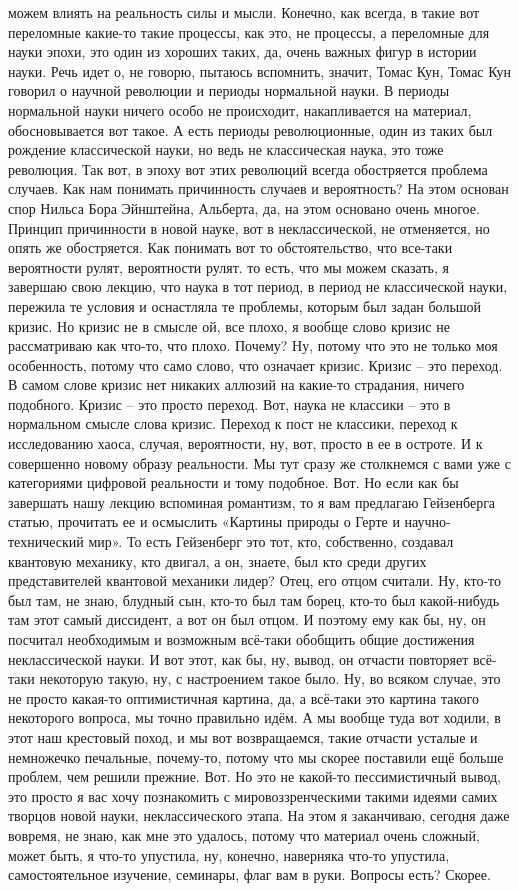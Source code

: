 можем влиять на реальность силы и мысли. Конечно, как всегда, в такие вот
переломные какие-то такие процессы, как это, не процессы, а переломные для науки
эпохи, это один из хороших таких, да, очень важных фигур в истории науки. Речь
идет о, не говорю, пытаюсь вспомнить, значит, Томас Кун, Томас Кун говорил о
научной революции и периоды нормальной науки. В периоды нормальной науки ничего
особо не происходит, накапливается на материал, обосновывается вот такое. А есть
периоды революционные, один из таких был рождение классической науки, но ведь не
классическая наука, это тоже революция. Так вот, в эпоху вот этих революций
всегда обостряется проблема случаев. Как нам понимать причинность случаев и
вероятность? На этом основан спор Нильса Бора Эйнштейна, Альберта, да, на этом
основано очень многое. Принцип причинности в новой науке, вот в неклассической,
не отменяется, но опять же обостряется. Как понимать вот то обстоятельство, что
все-таки вероятности рулят, вероятности рулят. то есть, что мы можем сказать, я
завершаю свою лекцию, что наука в тот период, в период не классической науки,
пережила те условия и оснастляла те проблемы, которым был задан большой кризис.
Но кризис не в смысле ой, все плохо, я вообще слово кризис не рассматриваю как
что-то, что плохо. Почему? Ну, потому что это не только моя особенность, потому
что само слово, что означает кризис. Кризис – это переход. В самом слове кризис
нет никаких аллюзий на какие-то страдания, ничего подобного. Кризис – это просто
переход. Вот, наука не классики – это в нормальном смысле слова кризис. Переход
к пост не классики, переход к исследованию хаоса, случая, вероятности, ну, вот,
просто в ее в остроте. И к совершенно новому образу реальности. Мы тут сразу же
столкнемся с вами уже с категориями цифровой реальности и тому подобное. Вот. Но
если как бы завершать нашу лекцию вспоминая романтизм, то я вам предлагаю
Гейзенберга статью, прочитать ее и осмыслить «Картины природы о Герте и научно-
технический мир». То есть Гейзенберг это тот, кто, собственно, создавал
квантовую механику, кто двигал, а он, знаете, был кто среди других
представителей квантовой механики лидер? Отец, его отцом считали. Ну, кто-то был
там, не знаю, блудный сын, кто-то был там борец, кто-то был какой-нибудь там
этот самый диссидент, а вот он был отцом. И поэтому ему как бы, ну, он посчитал
необходимым и возможным всё-таки обобщить общие достижения неклассической науки.
И вот этот, как бы, ну, вывод, он отчасти повторяет всё-таки некоторую такую,
ну, с настроением такое было. Ну, во всяком случае, это не просто какая-то
оптимистичная картина, да, а всё-таки это картина такого некоторого вопроса, мы
точно правильно идём. А мы вообще туда вот ходили, в этот наш крестовый поход, и
мы вот возвращаемся, такие отчасти усталые и немножечко печальные, почему-то,
потому что мы скорее поставили ещё больше проблем, чем решили прежние. Вот. Но
это не какой-то пессимистичный вывод, это просто я вас хочу познакомить с
мировоззренческими такими идеями самих творцов новой науки, неклассического
этапа. На этом я заканчиваю, сегодня даже вовремя, не знаю, как мне это удалось,
потому что материал очень сложный, может быть, я что-то упустила, ну, конечно,
наверняка что-то упустила, самостоятельное изучение, семинары, флаг вам в руки.
Вопросы есть? Скорее.
